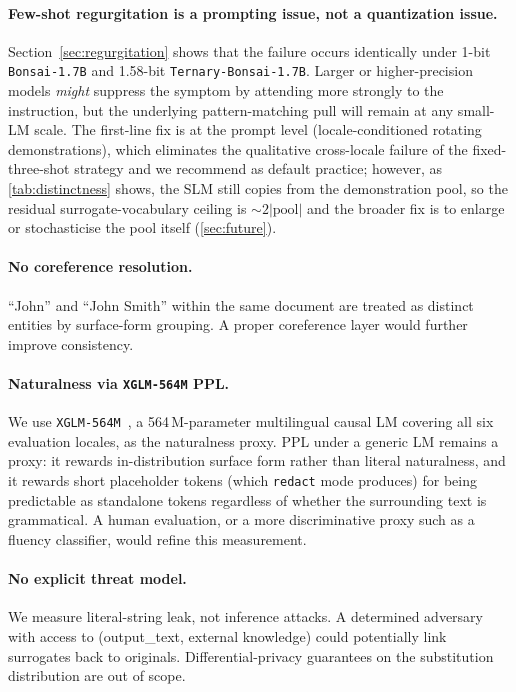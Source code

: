 \documentclass[11pt]{article}
\newcommand{\code}[1]{\texttt{#1}}
\newcommand{\bonsai}{\code{Bonsai-1.7B}}
\newcommand{\ternary}{\code{Ternary-Bonsai-1.7B}}
\newcommand{\xglm}{\code{XGLM-564M}}
\begin{document}
\paragraph{Few-shot regurgitation is a prompting issue, not a
quantization issue.}
Section~\ref{sec:regurgitation} shows that the failure occurs
identically under 1-bit \bonsai{} and 1.58-bit \ternary{}. Larger or
higher-precision models \emph{might} suppress the symptom by attending
more strongly to the instruction, but the underlying pattern-matching
pull will remain at any small-LM scale. The first-line fix is at the
prompt level (locale-conditioned rotating demonstrations), which
eliminates the qualitative cross-locale failure of the fixed-three-shot
strategy and we recommend as default practice; however, as
\cref{tab:distinctness} shows, the SLM still copies from the
demonstration pool, so the residual surrogate-vocabulary ceiling is
$\sim 2|\text{pool}|$ and the broader fix is to enlarge or stochasticise
the pool itself (\cref{sec:future}).

\paragraph{No coreference resolution.}
``John'' and ``John Smith'' within the same document are treated as
distinct entities by surface-form grouping. A proper coreference layer
would further improve consistency.

\paragraph{Naturalness via \xglm{} PPL.}
We use \xglm{}~\cite{xglm}, a 564\,M-parameter multilingual causal LM
covering all six evaluation locales, as the naturalness proxy. PPL
under a generic LM remains a proxy: it rewards in-distribution
surface form rather than literal naturalness, and it rewards short
placeholder tokens (which \code{redact} mode produces) for being
predictable as standalone tokens regardless of whether the
surrounding text is grammatical. A human evaluation, or a more
discriminative proxy such as a fluency classifier, would refine this
measurement.

\paragraph{No explicit threat model.}
We measure literal-string leak, not inference attacks. A determined
adversary with access to (output\_text, external knowledge) could
potentially link surrogates back to originals. Differential-privacy
guarantees on the substitution distribution are out of scope.
\end{document}
